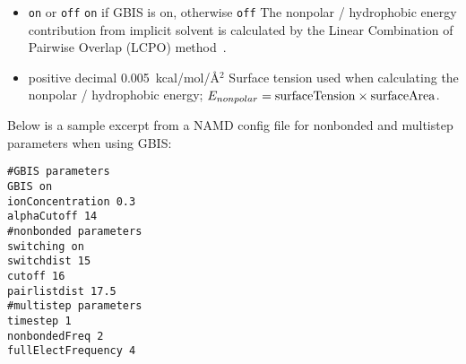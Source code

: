 \begin{itemize}
\item
{} {{\tt on} or {\tt off}} {{\tt on} if GBIS is on, otherwise {\tt off}} {The nonpolar / hydrophobic energy contribution from implicit solvent is calculated by the Linear Combination of Pairwise Overlap (LCPO) method~\cite{WEIS99}.}

\item
{} {positive decimal} {0.005~kcal/mol/\AA$^2$} {Surface tension used when calculating the nonpolar / hydrophobic energy; $E_{nonpolar} = {\rm surfaceTension} \times {\rm surfaceArea}$.}

\end{itemize}

Below is a sample excerpt from a NAMD config file for nonbonded and multistep parameters when using GBIS:
\begin{verbatim}
#GBIS parameters
GBIS on
ionConcentration 0.3
alphaCutoff 14
#nonbonded parameters
switching on
switchdist 15
cutoff 16
pairlistdist 17.5
#multistep parameters
timestep 1
nonbondedFreq 2
fullElectFrequency 4
\end{verbatim}
%
%
%

\begin{comment}

\end{comment}
